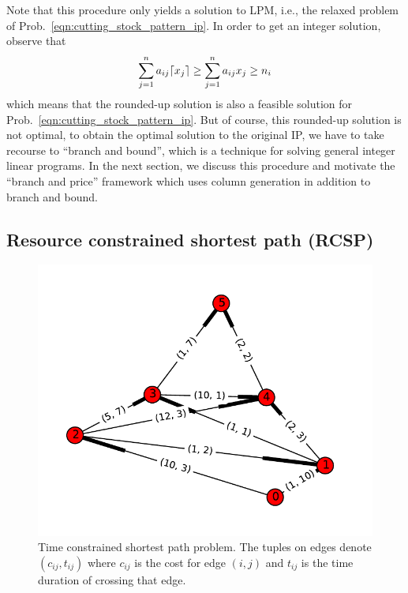 \documentclass[letterpaper, 10pt, twocolumn, reqno]{amsart}
\begin{document}
Note that this procedure only yields a solution to LPM, i.e., the relaxed problem of Prob.~\eqref{eqn:cutting_stock_pattern_ip}. In order to get an integer solution, observe that
$$
\sum_{j=1}^n a_{ij} \lceil x_j\rceil \geq \sum_{j=1}^n a_{ij} x_j \geq n_i
$$
which means that the rounded-up solution is also a feasible solution for Prob.~\eqref{eqn:cutting_stock_pattern_ip}. But of course, this rounded-up solution is not optimal, to obtain the optimal solution to the original IP, we have to take recourse to ``branch and bound'', which is a technique for solving general integer linear programs. In the next section, we discuss this procedure and motivate the ``branch and price'' framework which uses column generation in addition to branch and bound.

\subsection{Resource constrained shortest path (RCSP)}
\label{ssec:rcsp}

\begin{figure}
\centering
\includegraphics[width=0.8 \columnwidth]{roadnet}
\caption{Time constrained shortest path problem. The tuples on edges denote $(c_{ij}, t_{ij})$ where $c_{ij}$ is the cost for edge $(i,j)$ and $t_{ij}$ is the time duration of crossing that edge.}
\label{fig:rcsp}
\end{figure}
\end{document}
